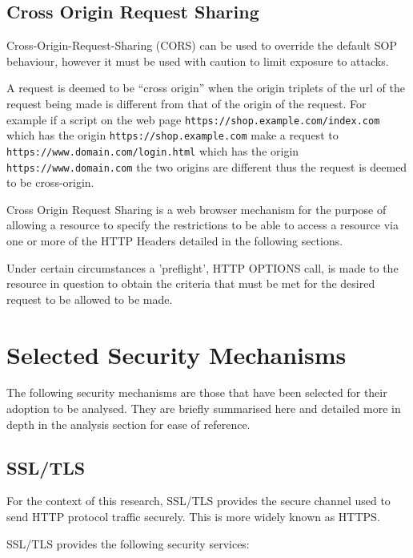 \documentclass{mscreport}
\begin{document}
\subsection{Cross Origin Request Sharing}
\label{section:Cross-Origin-Request-Sharing}
Cross-Origin-Request-Sharing (CORS) can be used to override the default SOP behaviour, however it must be used with caution to limit exposure to attacks.

\vspace{0.3cm} \noindent
A request is deemed to be ``cross origin'' when the origin triplets of the url of the request being made is different from that of the origin of the request. For example if a script on the web page \texttt{https://shop.example.com/index.com} which has the origin \texttt{https://shop.example.com} make a request to \texttt{https://www.domain.com/login.html} which has the origin \texttt{https://www.domain.com} the two origins are different thus the request is deemed to be cross-origin.

\vspace{0.3cm} \noindent
Cross Origin Request Sharing is a web browser mechanism for the purpose of allowing a resource to specify the restrictions to be able to access a resource via one or more of the HTTP Headers \cite{Apple2006-hk} detailed in the following sections.

\vspace{0.3cm} \noindent
Under certain circumstances a 'preflight', HTTP OPTIONS call, is made to the resource in question to obtain the criteria that must be met for the desired request to be allowed to be made.

\newpage

\section{Selected Security Mechanisms}

The following security mechanisms are those that have been selected for their adoption to be analysed. They are briefly summarised here and detailed more in depth in the analysis section for ease of reference.


\subsection{SSL/TLS}
For the context of this research, SSL/TLS provides the secure channel used to send HTTP protocol traffic securely. This is more widely known as HTTPS.

\vspace{0.3cm} \noindent
SSL/TLS provides the following security services:
\end{document}
